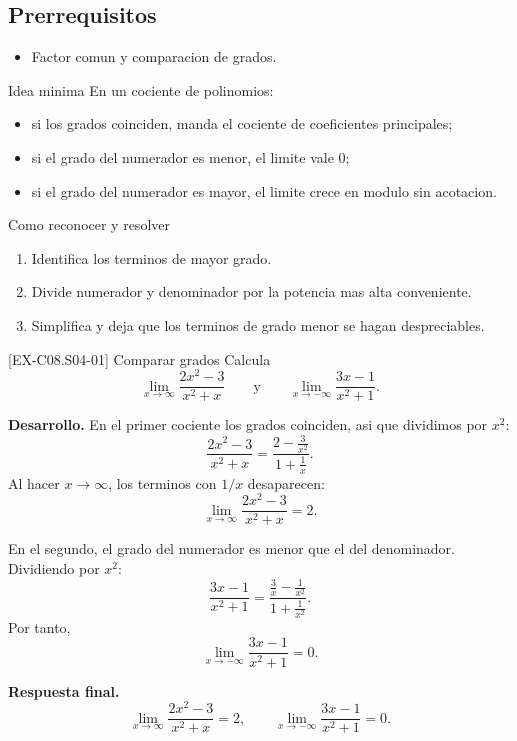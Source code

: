 \subsection*{Prerrequisitos}
\begin{itemize}
  \item Factor comun y comparacion de grados.
\end{itemize}

\begin{theorybox}{Idea minima}
En un cociente de polinomios:
\begin{itemize}
  \item si los grados coinciden, manda el cociente de coeficientes principales;
  \item si el grado del numerador es menor, el limite vale \(0\);
  \item si el grado del numerador es mayor, el limite crece en modulo sin acotacion.
\end{itemize}
\end{theorybox}

\begin{methodbox}{Como reconocer y resolver}
\begin{enumerate}
  \item Identifica los terminos de mayor grado.
  \item Divide numerador y denominador por la potencia mas alta conveniente.
  \item Simplifica y deja que los terminos de grado menor se hagan despreciables.
\end{enumerate}
\end{methodbox}

\begin{solvedexample}{[EX-C08.S04-01] Comparar grados}
Calcula
\[
\lim_{x\to\infty}\frac{2x^2-3}{x^2+x}
\qquad\text{y}\qquad
\lim_{x\to-\infty}\frac{3x-1}{x^2+1}.
\]

\textbf{Desarrollo.} En el primer cociente los grados coinciden, asi que dividimos por \(x^2\):
\[
\frac{2x^2-3}{x^2+x}=\frac{2-\frac{3}{x^2}}{1+\frac{1}{x}}.
\]
Al hacer \(x\to\infty\), los terminos con \(1/x\) desaparecen:
\[
\lim_{x\to\infty}\frac{2x^2-3}{x^2+x}=2.
\]

En el segundo, el grado del numerador es menor que el del denominador. Dividiendo por \(x^2\):
\[
\frac{3x-1}{x^2+1}=\frac{\frac{3}{x}-\frac{1}{x^2}}{1+\frac{1}{x^2}}.
\]
Por tanto,
\[
\lim_{x\to-\infty}\frac{3x-1}{x^2+1}=0.
\]

\textbf{Respuesta final.}
\[
\lim_{x\to\infty}\frac{2x^2-3}{x^2+x}=2,\qquad
\lim_{x\to-\infty}\frac{3x-1}{x^2+1}=0.
\]
\end{solvedexample}

